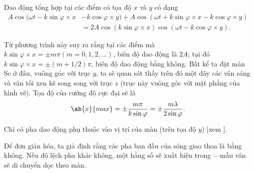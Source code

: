 Dao động tổng hợp tại các điểm có tọa độ $x$ và $y$ có dạng
\begin{align}
    A \cos(\omega t - k \sin\varphi \times x &- k \cos\varphi \times y) + A \cos(\omega t + k \sin\varphi \times x - k \cos\varphi \times y)\nonumber\\
    & = 2A \cos(k \sin\varphi \times x) \cos(\omega t - k \cos\varphi \times y). \label{eq:17_11}
\end{align}

Từ phương trình này suy ra rằng tại các điểm mà $k \sin\varphi \times x = \pm m\pi (m = 0, 1, 2, \ldots)$, biên độ dao động
là $2A$; tại đó $k \sin\varphi \times x = \pm (m+1/2)\pi$, biên độ dao động bằng không.
Bất kể ta đặt màn Sc ở đâu, vuông góc với trục $y$, ta sẽ quan sát thấy trên đó một dãy các vân sáng và vân tối xen kẽ song song với trục $z$ (trục này vuông góc với mặt phẳng của hình vẽ).
Tọa độ của cường độ cực đại sẽ là
\begin{equation}\label{eq:17_12}
    \ab{x}{max} = \pm \frac{m \pi}{k \sin\varphi} = \pm \frac{m \lambda}{2 \sin\varphi}.
\end{equation}

Chỉ có pha dao động phụ thuộc vào vị trí của màn (trên tọa độ $y$) [xem ].

Để đơn giản hóa, ta giả định rằng các pha ban đầu của sóng giao thoa là bằng không.
Nếu độ lệch pha khác không, một hằng số sẽ xuất hiện trong ---mẫu vân sẽ di chuyển dọc theo màn.

